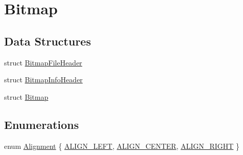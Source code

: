 \hypertarget{group___bitmap}{}\section{Bitmap}
\label{group___bitmap}
\subsection*{Data Structures}
\begin{DoxyCompactItemize}
\item 
struct \hyperlink{struct_bitmap_file_header}{Bitmap\+File\+Header}
\item 
struct \hyperlink{struct_bitmap_info_header}{Bitmap\+Info\+Header}
\item 
struct \hyperlink{struct_bitmap}{Bitmap}
\end{DoxyCompactItemize}
\subsection*{Enumerations}
\begin{DoxyCompactItemize}
\item 
enum \hyperlink{group___bitmap_gacdfaca60ec19c0265bac2692d7982726}{Alignment} \{ \hyperlink{group___bitmap_ggacdfaca60ec19c0265bac2692d7982726a6ec599857e15466988726932dd592305}{A\+L\+I\+G\+N\+\_\+\+L\+E\+FT}, 
\hyperlink{group___bitmap_ggacdfaca60ec19c0265bac2692d7982726a5624165187e56db612253e608a45b1c6}{A\+L\+I\+G\+N\+\_\+\+C\+E\+N\+T\+ER}, 
\hyperlink{group___bitmap_ggacdfaca60ec19c0265bac2692d7982726a9c81840e8cad46418b39a8b74a246354}{A\+L\+I\+G\+N\+\_\+\+R\+I\+G\+HT}
 \}
\end{DoxyCompactItemize}
